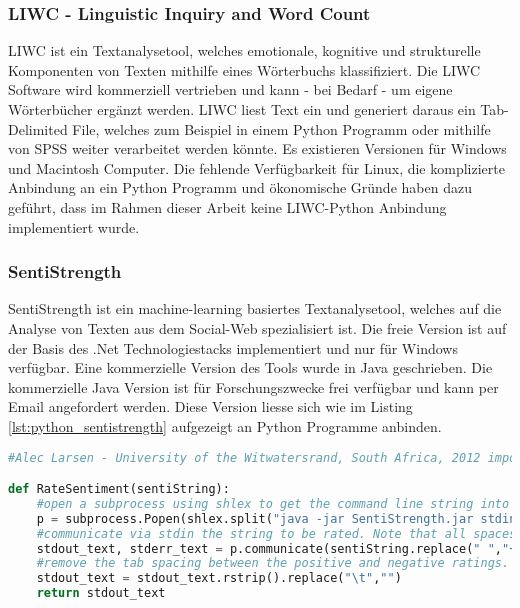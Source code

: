 \subsubsection{LIWC - Linguistic Inquiry and Word Count}
LIWC ist ein Textanalysetool, welches emotionale, kognitive und strukturelle Komponenten von Texten mithilfe eines Wörterbuchs klassifiziert. Die LIWC Software wird kommerziell vertrieben und kann - bei Bedarf - um eigene Wörterbücher ergänzt werden. LIWC liest Text ein und generiert daraus ein Tab-Delimited File, welches zum Beispiel in einem Python Programm oder mithilfe von SPSS weiter verarbeitet werden könnte. Es existieren Versionen für Windows und Macintosh Computer. \cite{comparing}\cite{liwcfaq} Die fehlende Verfügbarkeit für Linux, die komplizierte Anbindung an ein Python Programm und ökonomische Gründe haben dazu geführt, dass im Rahmen dieser Arbeit keine LIWC-Python Anbindung implementiert wurde.

\subsubsection{SentiStrength}
SentiStrength ist ein machine-learning basiertes Textanalysetool, welches auf die Analyse von Texten aus dem Social-Web spezialisiert ist. Die freie Version ist auf der Basis des .Net Technologiestacks implementiert und nur für Windows verfügbar. Eine kommerzielle Version des Tools wurde in Java geschrieben. Die kommerzielle Java Version ist für Forschungszwecke frei verfügbar und kann per Email angefordert werden. Diese Version liesse sich wie im Listing \ref{lst:python_sentistrength} aufgezeigt an Python Programme anbinden. \cite{sentistrength}\cite{comparing}

\begin{lstlisting}[language=Python, caption={Python Anbindung an SentiStrength (JAVA)}, label={lst:python_sentistrength}]
#Alec Larsen - University of the Witwatersrand, South Africa, 2012 import shlex, subprocess

def RateSentiment(sentiString):
    #open a subprocess using shlex to get the command line string into the correct args list format
    p = subprocess.Popen(shlex.split("java -jar SentiStrength.jar stdin sentidata C:/SentStrength_Data/"),stdin=subprocess.PIPE,stdout=subprocess.PIPE,stderr=subprocess.PIPE)
    #communicate via stdin the string to be rated. Note that all spaces are replaced with +
    stdout_text, stderr_text = p.communicate(sentiString.replace(" ","+"))
    #remove the tab spacing between the positive and negative ratings. e.g. 1-5 -> 1-5
    stdout_text = stdout_text.rstrip().replace("\t","")
    return stdout_text
\end{lstlisting}

